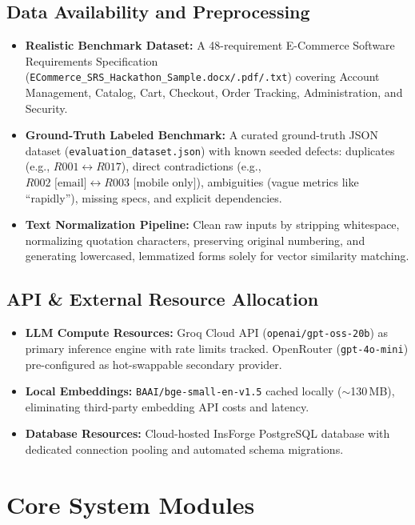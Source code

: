 \documentclass[11pt,a4paper]{article}
\begin{document}
\subsection{Data Availability and Preprocessing}
\begin{itemize}
  \item \textbf{Realistic Benchmark Dataset:} A 48-requirement E-Commerce Software Requirements Specification (\texttt{ECommerce\_SRS\_Hackathon\_Sample.docx/.pdf/.txt}) covering Account Management, Catalog, Cart, Checkout, Order Tracking, Administration, and Security.
  \item \textbf{Ground-Truth Labeled Benchmark:} A curated ground-truth JSON dataset (\texttt{evaluation\_dataset.json}) with known seeded defects: duplicates (e.g., $R001 \leftrightarrow R017$), direct contradictions (e.g., $R002 \text{ [email]} \leftrightarrow R003 \text{ [mobile only]}$), ambiguities (vague metrics like ``rapidly''), missing specs, and explicit dependencies.
  \item \textbf{Text Normalization Pipeline:} Clean raw inputs by stripping whitespace, normalizing quotation characters, preserving original numbering, and generating lowercased, lemmatized forms solely for vector similarity matching.
\end{itemize}

\subsection{API \& External Resource Allocation}
\begin{itemize}
  \item \textbf{LLM Compute Resources:} Groq Cloud API (\texttt{openai/gpt-oss-20b}) as primary inference engine with rate limits tracked. OpenRouter (\texttt{gpt-4o-mini}) pre-configured as hot-swappable secondary provider.
  \item \textbf{Local Embeddings:} \texttt{BAAI/bge-small-en-v1.5} cached locally ($\sim$130\,MB), eliminating third-party embedding API costs and latency.
  \item \textbf{Database Resources:} Cloud-hosted InsForge PostgreSQL database with dedicated connection pooling and automated schema migrations.
\end{itemize}

\section{Core System Modules}
\end{document}
